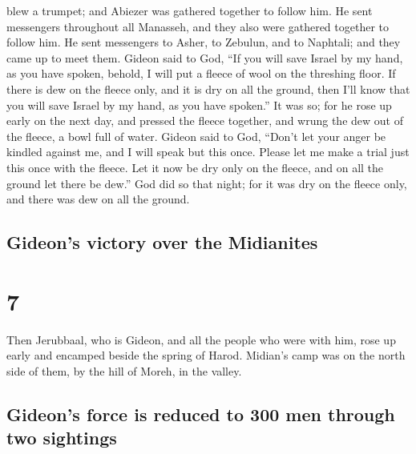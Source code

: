blew a trumpet; and Abiezer was gathered together to follow him.
 He sent messengers throughout all Manasseh, and they
also were gathered together to follow him. He sent messengers to Asher,
to Zebulun, and to Naphtali; and they came up to meet them.
 Gideon said to God, ``If you will save Israel by my
hand, as you have spoken,  behold, I will put a fleece of
wool on the threshing floor. If there is dew on the fleece only, and it
is dry on all the ground, then I'll know that you will save Israel by my
hand, as you have spoken.''  It was so; for he rose up
early on the next day, and pressed the fleece together, and wrung the
dew out of the fleece, a bowl full of water.  Gideon said
to God, ``Don't let your anger be kindled against me, and I will speak
but this once. Please let me make a trial just this once with the
fleece. Let it now be dry only on the fleece, and on all the ground let
there be dew.''  God did so that night; for it was dry on
the fleece only, and there was dew on all the ground.

\hypertarget{gideons-victory-over-the-midianites}{%
\subsection{Gideon's victory over the
Midianites}\label{gideons-victory-over-the-midianites}}

\hypertarget{section-6}{%
\section{7}\label{section-6}}

 Then Jerubbaal, who is Gideon, and all the people who
were with him, rose up early and encamped beside the spring of Harod.
Midian's camp was on the north side of them, by the hill of Moreh, in
the valley.

\hypertarget{gideons-force-is-reduced-to-300-men-through-two-sightings}{%
\subsection{Gideon's force is reduced to 300 men through two
sightings}\label{gideons-force-is-reduced-to-300-men-through-two-sightings}}

